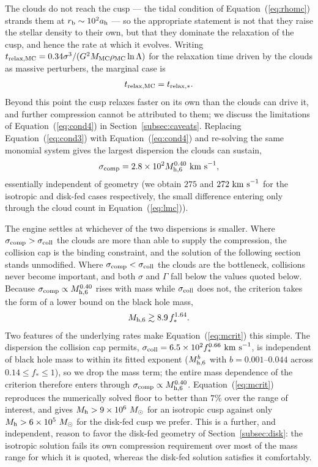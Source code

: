 \documentclass[preprint2]{aastex}
\newcommand{\msun}{M_{\odot}\xspace}
\newcommand{\mhsix}{M_{\rm h,6}\xspace}
\begin{document}
The clouds do not reach the cusp --- the tidal condition of Equation~(\ref{eq:rhomc}) strands them at $r_{\rm b} \sim 10^{2} a_{\rm h}$ --- so the appropriate statement is not that they raise the stellar density to their own, but that they dominate the relaxation of the cusp, and hence the rate at which it evolves. Writing $t_{\rm relax,MC} = 0.34\sigma^{3}/(G^{2} M_{\rm MC} \rho_{\rm MC} \ln\Lambda)$ for the relaxation time driven by the clouds as massive perturbers, the marginal case is
\begin{equation}
t_{\rm relax,MC} = t_{\rm relax,\ast}.\label{eq:cond4}
\end{equation}
Beyond this point the cusp relaxes faster on its own than the clouds can drive it, and further compression cannot be attributed to them; we discuss the limitations of Equation~(\ref{eq:cond4}) in Section~\ref{subsec:caveats}. Replacing Equation~(\ref{eq:cond3}) with Equation~(\ref{eq:cond4}) and re-solving the same monomial system gives the largest dispersion the clouds can sustain,
\begin{equation}
\sigma_{\rm comp} = 2.8 \times 10^{2} \mhsix^{0.40}~{\rm km~s}^{-1},\label{eq:sigcomp}
\end{equation}
essentially independent of geometry (we obtain $275$ and $272~{\rm km~s}^{-1}$ for the isotropic and disk-fed cases respectively, the small difference entering only through the cloud count in Equation~(\ref{eq:lmc})).

The engine settles at whichever of the two dispersions is smaller. Where $\sigma_{\rm comp} > \sigma_{\rm coll}$ the clouds are more than able to supply the compression, the collision cap is the binding constraint, and the solution of the following section stands unmodified. Where $\sigma_{\rm comp} < \sigma_{\rm coll}$ the clouds are the bottleneck, collisions never become important, and both $\sigma$ and $\Gamma$ fall below the values quoted below. Because $\sigma_{\rm comp} \propto \mhsix^{0.40}$ rises with mass while $\sigma_{\rm coll}$ does not, the criterion takes the form of a lower bound on the black hole mass,
\begin{equation}
\mhsix \gtrsim 8.9\, f_{\ast}^{1.64}.\label{eq:mcrit}
\end{equation}
Two features of the underlying rates make Equation~(\ref{eq:mcrit}) this simple. The dispersion the collision cap permits, $\sigma_{\rm coll} = 6.5 \times 10^{2} f_{\ast}^{0.66}~{\rm km~s}^{-1}$, is independent of black hole mass to within its fitted exponent ($\mhsix^{b}$ with $b = 0.001$--$0.044$ across $0.14 \le f_{\ast} \le 1$), so we drop the mass term; the entire mass dependence of the criterion therefore enters through $\sigma_{\rm comp} \propto \mhsix^{0.40}$. Equation~(\ref{eq:mcrit}) reproduces the numerically solved floor to better than $7\%$ over the range of interest, and gives $M_{\rm h} > 9 \times 10^{6}~\msun$ for an isotropic cusp against only $M_{\rm h} > 6 \times 10^{5}~\msun$ for the disk-fed cusp we prefer. This is a further, and independent, reason to favor the disk-fed geometry of Section~\ref{subsec:disk}: the isotropic solution fails its own compression requirement over most of the mass range for which it is quoted, whereas the disk-fed solution satisfies it comfortably.
\end{document}

